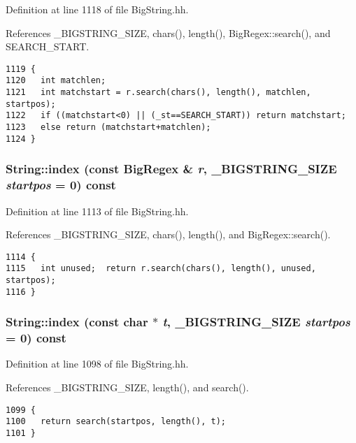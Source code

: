 Definition at line 1118 of file Big\-String.hh.

References \_\-BIGSTRING\_\-SIZE, chars(), length(), Big\-Regex::search(), and SEARCH\_\-START.



\footnotesize\begin{verbatim}1119 {
1120   int matchlen;
1121   int matchstart = r.search(chars(), length(), matchlen, startpos);
1122   if ((matchstart<0) || (_st==SEARCH_START)) return matchstart;
1123   else return (matchstart+matchlen);
1124 }
\end{verbatim}\normalsize 
{}
\subsubsection{ String::index (const {\bf Big\-Regex} \& {\em r}, {\bf \_\-BIGSTRING\_\-SIZE} {\em startpos} = 0) const\hspace{0.3cm}{\tt  [inline]}}\label{classString_a30}




Definition at line 1113 of file Big\-String.hh.

References \_\-BIGSTRING\_\-SIZE, chars(), length(), and Big\-Regex::search().



\footnotesize\begin{verbatim}1114 {
1115   int unused;  return r.search(chars(), length(), unused, startpos);
1116 }
\end{verbatim}\normalsize 
{}
\subsubsection{ String::index (const char $\ast$ {\em t}, {\bf \_\-BIGSTRING\_\-SIZE} {\em startpos} = 0) const\hspace{0.3cm}{\tt  [inline]}}\label{classString_a29}




Definition at line 1098 of file Big\-String.hh.

References \_\-BIGSTRING\_\-SIZE, length(), and search().



\footnotesize\begin{verbatim}1099 {   
1100   return search(startpos, length(), t);
1101 }
\end{verbatim}\normalsize 
{}
